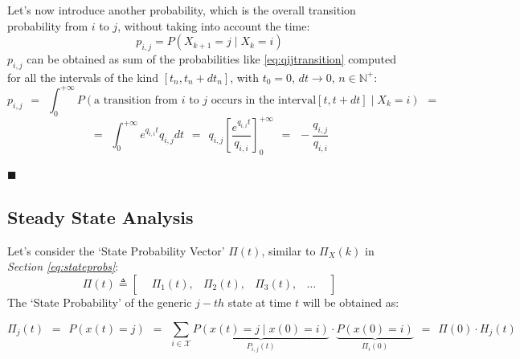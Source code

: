 \documentclass[12pt,a4paper]{article}
\begin{document}
\noindent 
Let's now introduce another probability, which is the overall transition probability from $i$ to $j$, without taking into account the time:
$$
p_{i,j}=P(X_{k+1}=j  \mid  X_k=i)
$$
$p_{i,j}$ can be obtained as sum of the probabilities like \ref{eq:qijtransition} computed for all the intervals of the kind 
$[t_n,t_n+dt_n]$, with $t_0=0$, $dt \rightarrow 0$, $n\in \mathbb{N}^+$:
$$
p_{i,j}
\hspace{5pt}
=
\hspace{5pt}
\int_0^{+\infty}{P\left( \textrm{a transition from }i\textrm{ to }j 
\textrm{ occurs in the interval} \left[ t, t+dt\right]
 \mid 
X_k=i
\right)} 
\hspace{5pt}
=
$$
$$
=
\hspace{5pt}
\int_0^{+\infty}{
e^{q_{i,i} t}q_{i,j}dt
}
\hspace{5pt}
=
\hspace{5pt}
q_{i,j}\left[ \frac{e^{q_{i,i}t}}{q_{i,i}}\right]_0^{+\infty}
\hspace{5pt}
=
\hspace{5pt}
-\frac{q_{i,j}}{q_{i,i}}
$$
\begin{flushright}
$\blacksquare$
\end{flushright}
\newpage
\subsection{Steady State Analysis}
Let's consider the `State Probability Vector' $\Pi(t)$, similar to $\Pi_X(k)$ in \emph{Section \ref{eq:stateprobs}}:
$$
\Pi(t)\triangleq \left[
\begin{matrix}
&\Pi_1(t),& \Pi_2(t),& \Pi_3(t),& \dots&
\end{matrix}
\right]
$$ 
The `State Probability' of the generic $j-th$ state at time $t$ will be obtained as:

$$
\Pi_j\left(t\right)\hspace{5pt}=\hspace{5pt} P\left(x\left(t\right)=j\right)
\hspace{5pt}=\hspace{5pt} 
\sum_{i\in\mathcal{X}}{
\underbrace{
P\left( x \left( t \right) = j  \mid   x\left(0\right)=i\right)
}_{P_{i,j}(t)}
\cdot
\underbrace{
P\left(x\left(0\right)=i\right)
}_{\Pi_i(0)}
}\hspace{5pt}=\hspace{5pt}
\Pi(0)\cdot H_j(t)
$$
\end{document}
